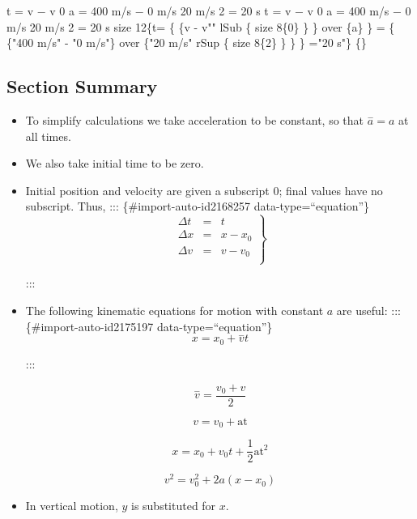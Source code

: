 \documentclass[
]{book}
\begin{document}
\leavevmode\hypertarget{import-auto-id2168930}{}%
{t = v − v 0 a = 400 m/s − 0 m/s 20 m/s 2 = 20 s t = v − v 0 a = 400
m/s − 0 m/s 20 m/s 2 = 20 s size 12\{t= \{ \{v - v"" lSub \{ size 8\{0\} \} \}
over \{a\} \} = \{ \{"400 m/s" - "0 m/s"\} over \{"20 m/s" rSup \{ size
8\{2\} \} \} \} ="20 s"\} \{\}}

\hypertarget{fs-id1164906426121-summary}{}
\hypertarget{section-summary-4}{%
\subsection{Section Summary}\label{section-summary-4}}

\begin{itemize}
\item
  \protect\hypertarget{import-auto-id2171459}{}{To simplify calculations we take acceleration to be constant, so
  that \({\overset{-}{a} = a}{}\) at all times.}
\item
  \protect\hypertarget{import-auto-id2168260}{}{We also take initial time to be zero.}
\item
  \protect\hypertarget{import-auto-id2167408}{}{Initial position and velocity are given a subscript 0; final values
  have no subscript. Thus,}
  ::: \{\#import-auto-id2168257 data-type=``equation''\}
  \[\left. \begin{array}{lll}
  {\Delta t} & = & t \\
  {\Delta x} & = & {x - x_{0}} \\
  {\Delta v} & = & {v - v_{0}} \\
  \end{array} \right\}\]

  :::
\item
  \protect\hypertarget{import-auto-id2175179}{}{The following kinematic equations for motion with constant \(a{}\)
  are useful:}
  ::: \{\#import-auto-id2175197 data-type=``equation''\}
  \[{{x = {x_{0} + \overset{-}{v}}}t}{}\]

  :::

  \leavevmode\hypertarget{import-auto-id2175206}{}%
  \[{\overset{-}{v} = \frac{v_{0} + v}{2}}{}\]

  \leavevmode\hypertarget{import-auto-id2175249}{}%
  \[{v = {v_{0} + \text{at}}}{}\]

  \leavevmode\hypertarget{import-auto-id2176087}{}%
  \[{{x = {x_{0} + v_{0}}}{t + \frac{1}{2}}\text{at}^{2}}{}\]

  \leavevmode\hypertarget{import-auto-id2175231}{}%
  \[{{v^{2} = {v_{0}^{2} + 2a}}\left( {x - x_{0}} \right)}{}\]
\item
  \protect\hypertarget{import-auto-id2176131}{}{In vertical motion, \(y{}\) is substituted for
  \(x{}\).}
\end{itemize}
\end{document}
